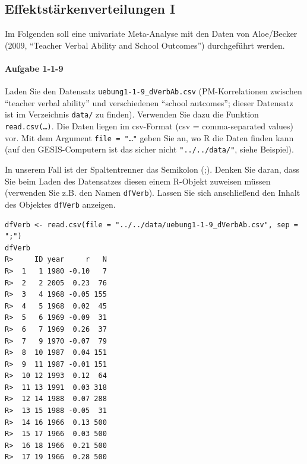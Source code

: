 \documentclass[normalheadings, 10pt]{scrartcl}\usepackage{graphicx, color}
\makeatletter
\newenvironment{kframe}{%
 \def\at@end@of@kframe{}%
 \ifinner\ifhmode%
  \def\at@end@of@kframe{\end{minipage}}%
  \begin{minipage}{\columnwidth}%
 \fi\fi%
 \def\FrameCommand##1{\hskip\@totalleftmargin \hskip-\fboxsep
 \colorbox{shadecolor}{##1}\hskip-\fboxsep
     \hskip-\linewidth \hskip-\@totalleftmargin \hskip\columnwidth}%
 \MakeFramed {\advance\hsize-\width
   \@totalleftmargin\z@ \linewidth\hsize
   \@setminipage}}%
 {\par\unskip\endMakeFramed%
 \at@end@of@kframe}
\newenvironment{knitrout}{}{} %
\newcommand{\code}[1]{\texttt{#1}}
\makeatother
\begin{document}
\subsection{Effektstärkenverteilungen I}

Im Folgenden soll eine univariate Meta-Analyse mit den
Daten von Aloe/Becker (2009, "`Teacher Verbal Ability and School Outcomes"')
durchgeführt werden.


\paragraph{Aufgabe 1-1-9} Laden Sie den Datensatz
\texttt{uebung1-1-9\_dVerbAb.csv} (PM-Korrelationen zwischen "`teacher verbal
ability"' und verschiedenen "`school autcomes"'; dieser Datensatz ist im
Verzeichnis \texttt{data/} zu finden). Verwenden Sie dazu die Funktion
\code{read.csv(\ldots)}. Die Daten liegen im csv-Format (csv = comma-separated
values) vor. Mit dem Argument \code{file = "\ldots"} geben Sie an, wo R die
Daten finden kann (auf den GESIS-Computern ist das sicher nicht
\code{"../../data/"}, siehe Beispiel).

In unserem Fall ist der Spaltentrenner das Semikolon (;). Denken Sie daran, dass
Sie beim Laden des Datensatzes diesen einem R-Objekt zuweisen müssen (verwenden
Sie z.B. den Namen \code{dfVerb}). Lassen Sie sich anschließend den Inhalt des
Objektes \code{dfVerb} anzeigen.

\begin{rbsp}
\begin{knitrout}
\color{fgcolor}\begin{kframe}
\begin{verbatim}
dfVerb <- read.csv(file = "../../data/uebung1-1-9_dVerbAb.csv", sep = ";")
dfVerb
R>     ID year     r   N
R>  1   1 1980 -0.10   7
R>  2   2 2005  0.23  76
R>  3   4 1968 -0.05 155
R>  4   5 1968  0.02  45
R>  5   6 1969 -0.09  31
R>  6   7 1969  0.26  37
R>  7   9 1970 -0.07  79
R>  8  10 1987  0.04 151
R>  9  11 1987 -0.01 151
R>  10 12 1993  0.12  64
R>  11 13 1991  0.03 318
R>  12 14 1988  0.07 288
R>  13 15 1988 -0.05  31
R>  14 16 1966  0.13 500
R>  15 17 1966  0.03 500
R>  16 18 1966  0.21 500
R>  17 19 1966  0.28 500
\end{verbatim}
\end{kframe}
\end{knitrout}

\end{rbsp}

\pagebreak
\end{document}
